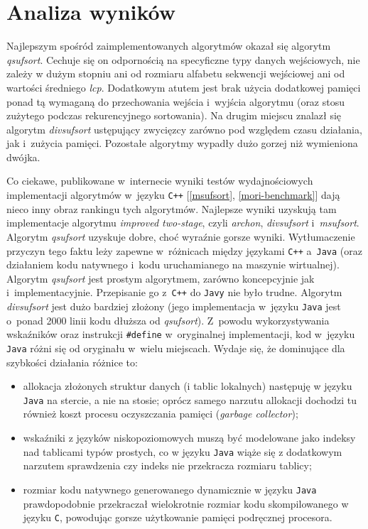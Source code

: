 \FloatBarrier
\section{Analiza wyników}

Najlepszym spośród zaimplementowanych algorytmów okazał się algorytm \emph{qsufsort}. Cechuje się on
odpornością na specyficzne typy danych wejściowych, nie zależy w dużym stopniu ani od rozmiaru
alfabetu sekwencji wejściowej ani od wartości średniego \emph{lcp}. Dodatkowym atutem jest brak
użycia dodatkowej pamięci ponad tą wymaganą do przechowania wejścia i~wyjścia algorytmu (oraz stosu
zużytego podczas rekurencyjnego sortowania). Na drugim miejscu znalazł się algorytm
\emph{divsufsort} ustępujący zwycięzcy zarówno pod względem czasu działania, jak i~zużycia pamięci.
Pozostałe algorytmy wypadły dużo gorzej niż wymieniona dwójka.

Co ciekawe, publikowane w~internecie wyniki testów wydajnościowych implementacji algorytmów w~języku
\texttt{C++} [\ref{msufsort}, \ref{mori-benchmark}] dają nieco inny obraz rankingu tych algorytmów.
Najlepsze wyniki uzyskują tam implementacje algorytmu \emph{improved two-stage}, czyli
\emph{archon}, \emph{divsufsort} i~\emph{msufsort}. Algorytm \emph{qsufsort} uzyskuje dobre, choć
wyraźnie gorsze wyniki. Wytłumaczenie przyczyn tego faktu leży zapewne w~różnicach między językami
\texttt{C++} a~\texttt{Java} (oraz działaniem kodu natywnego i~kodu uruchamianego na maszynie
wirtualnej). Algorytm \emph{qsufsort} jest prostym algorytmem, zarówno koncepcyjnie jak
i~implementacyjnie. Przepisanie go z~\texttt{C++} do \texttt{Javy} nie było trudne. Algorytm
\emph{divsufsort} jest dużo bardziej złożony (jego implementacja w~języku \texttt{Java} jest o~ponad
2000 linii kodu dłuższa od \emph{qsufsort}). Z~powodu wykorzystywania wskaźników oraz instrukcji
\texttt{\#define} w~oryginalnej implementacji, kod w~języku \texttt{Java} różni się od oryginału
w~wielu miejscach. Wydaje się, że dominujące dla szybkości działania różnice to:
\begin{itemize}
    \item allokacja złożonych struktur danych (i tablic lokalnych) następuję w języku \texttt{Java}
    na stercie, a nie na stosie; oprócz samego narzutu allokacji dochodzi tu również koszt 
    procesu oczyszczania pamięci (\emph{garbage collector});
    
    \item wskaźniki z języków niskopoziomowych muszą być modelowane jako indeksy nad tablicami typów prostych, 
    co w języku \texttt{Java} wiąże się z dodatkowym narzutem sprawdzenia czy indeks nie przekracza
    rozmiaru tablicy;

    \item rozmiar kodu natywnego generowanego dynamicznie w języku \texttt{Java} prawdopodobnie przekraczał wielokrotnie
    rozmiar kodu skompilowanego w języku \texttt{C}, powodując gorsze użytkowanie pamięci podręcznej
    procesora.
\end{itemize}

